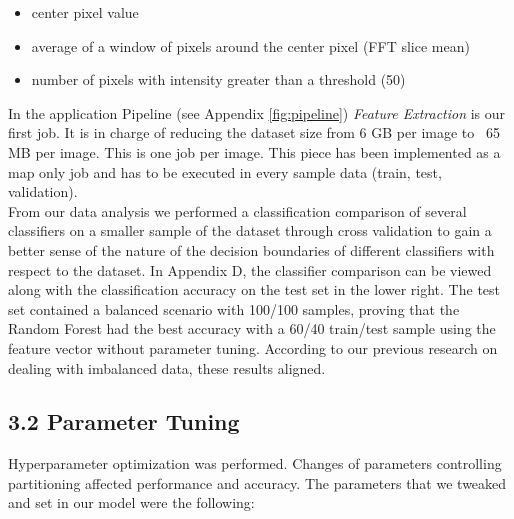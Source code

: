 \documentclass{neu_handout}
\begin{document}
\begin{itemize}
\setlength\itemsep{0.2em}
\item center pixel value
\item average of a window of pixels around the center pixel (FFT slice mean)
\item number of pixels with intensity greater than a threshold (50)
\end{itemize}

In the application Pipeline (see Appendix \ref{fig:pipeline}) \textit{Feature Extraction} is our first job. It is in charge of reducing the dataset size from 6 GB per image to ~65 MB per image. This is one job per image. This piece has been implemented as a map only job and has to be executed in every sample data (train, test, validation). \\

From our data analysis we performed a classification comparison \cite{compare} of several classifiers on a smaller sample of the dataset through cross validation to gain a better sense of the nature of the decision boundaries of different classifiers with respect to the dataset. In Appendix D, the classifier comparison can be viewed along with the classification accuracy on the test set in the lower right. The test set contained a balanced scenario with 100/100 samples, proving that the Random Forest had the best accuracy with a 60/40 train/test sample using the feature vector without parameter tuning. According to our previous research on dealing with imbalanced data, these results aligned.

\subsection*{3.2 Parameter Tuning}

Hyperparameter optimization was performed. Changes of parameters controlling partitioning affected performance and accuracy. The parameters that we tweaked and set in our model were the following:
\end{document}

